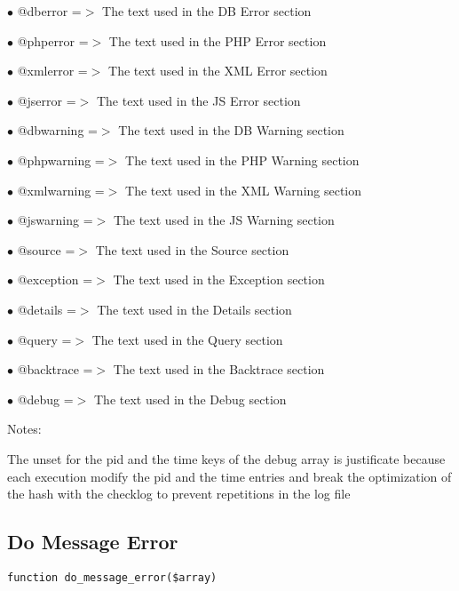 \documentclass[a4paper]{book}
\begin{document}
\begin{compactitem}
\item[\color{myblue}$\bullet$] @dberror    =$>$ The text used in the DB Error section
\item[\color{myblue}$\bullet$] @phperror   =$>$ The text used in the PHP Error section
\item[\color{myblue}$\bullet$] @xmlerror   =$>$ The text used in the XML Error section
\item[\color{myblue}$\bullet$] @jserror    =$>$ The text used in the JS Error section
\item[\color{myblue}$\bullet$] @dbwarning  =$>$ The text used in the DB Warning section
\item[\color{myblue}$\bullet$] @phpwarning =$>$ The text used in the PHP Warning section
\item[\color{myblue}$\bullet$] @xmlwarning =$>$ The text used in the XML Warning section
\item[\color{myblue}$\bullet$] @jswarning  =$>$ The text used in the JS Warning section
\item[\color{myblue}$\bullet$] @source     =$>$ The text used in the Source section
\item[\color{myblue}$\bullet$] @exception  =$>$ The text used in the Exception section
\item[\color{myblue}$\bullet$] @details    =$>$ The text used in the Details section
\item[\color{myblue}$\bullet$] @query      =$>$ The text used in the Query section
\item[\color{myblue}$\bullet$] @backtrace  =$>$ The text used in the Backtrace section
\item[\color{myblue}$\bullet$] @debug      =$>$ The text used in the Debug section
\end{compactitem}

Notes:

The unset for the pid and the time keys of the debug array is justificate
because each execution modify the pid and the time entries and break the
optimization of the hash with the checklog to prevent repetitions in the
log file

\hypertarget{toc105}{}
\subsection{Do Message Error}

\begin{lstlisting}
function do_message_error($array)
\end{lstlisting}
\end{document}
